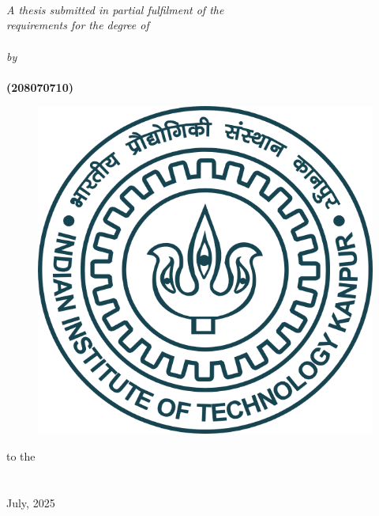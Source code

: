 \documentclass[11pt, a4paper, oneside]{Thesis} %
\begin{document}
\begin{titlepage}
\begin{center}

\HRule \\[0.4cm] %
{\huge \bfseries \ttitle}\\[0.4cm] %
\HRule \\[1.5cm] %
 
\large \textit{A thesis submitted in partial fulfilment of the \\requirements for the degree of}\\[0.3cm]
\textbf{\degreename}\\[0.3cm] %
\textit{by}\\[0.3cm]
\textbf{\authornames} \\[0.3cm]
\textbf{(208070710)}

\vfill
\graphicspath{ {./Figures/} }
\begin{figure}[hb]
  \centering
  \includegraphics[width=0.35\linewidth]{images/iitk_logo.png}
\end{figure}
to the\\
\DEPTNAME\\ %
\textsc{ \UNIVNAME}\\[1.5cm] %
\large July, 2025\\[2cm] %

\end{center}
\end{titlepage}


\end{document}
